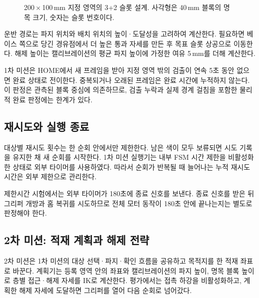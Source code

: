 \begin{figure}[htbp]
\centering
{}
\caption{200\,$\times$\,100\,mm 지정 영역의 3+2 슬롯 설계. 사각형은 40\,mm 블록의 명목 크기, 숫자는 슬롯 번호이다.}
\label{fig:slots}
\end{figure}

운반 경로는 파지 위치와 배치 위치의 높이·도달성을 고려하여 계산한다. 필요하면 베이스 쪽으로 당긴 경유점에서 더 높은 통과 자세를 만든 후 목표 슬롯 상공으로 이동한다. 해제 높이는 캘리브레이션의 평균 파지 높이에 가정한 여유 5\,mm를 더해 계산한다.

1차 미션은 HOME에서 새 프레임을 받아 지정 영역 밖의 검출이 연속 5초 동안 없으면 완료 상태로 전이한다. 중복되거나 오래된 프레임은 완료 시간에 누적하지 않는다. 이 판정은 관측된 블록 중심에 의존하므로, 검출 누락과 실제 경계 걸침을 포함한 물리적 완료 판정에는 한계가 있다.

\subsection{재시도와 실행 종료}
대상별 재시도 횟수는 한 순회 안에서만 제한한다. 남은 색이 모두 보류되면 시도 기록을 유지한 채 새 순회를 시작한다. 1차 미션 실행기는 내부 FSM 시간 제한을 비활성화한 상태로 외부 타이머를 사용하였다. 따라서 순회가 반복될 때 늘어나는 누적 재시도 시간은 외부 제한으로 관리한다.

제한시간 시험에서는 외부 타이머가 180초에 종료 신호를 보낸다. 종료 신호를 받은 뒤 그리퍼 개방과 홈 복귀를 시도하므로 전체 모터 동작이 180초 안에 끝나는지는 별도로 판정해야 한다.

\subsection{2차 미션: 적재 계획과 해제 전략}
2차 미션은 1차 미션의 대상 선택·파지·확인 흐름을 공유하고 목적지를 한 적재 좌표로 바꾼다. 계획기는 등록 영역 안의 좌표와 캘리브레이션의 파지 높이, 명목 블록 높이로 층별 접근·해제 자세를 IK로 계산한다. 평가에서는 접촉 하강을 비활성화하고, 계획한 해제 자세에 도달하면 그리퍼를 열어 다음 순회로 넘어갔다.

